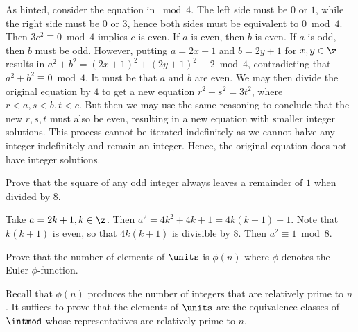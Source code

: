 \begin{problems}
    \begin{sol}
        As hinted, consider the equation in $\bmod 4$. The left side must be $0$ or $1$, while the right side must be $0$ or $3$, hence both sides must be equivalent to $0 \bmod 4$. Then $3c^2 \equiv 0 \bmod 4$ implies $c$ is even. If $a$ is even, then $b$ is even. If $a$ is odd, then $b$ must be odd. However, putting $a = 2x + 1$ and $b = 2y + 1$ for $x, y \in \z$ results in $a^2 + b^2 = (2x + 1)^2 + (2y + 1)^2 \equiv 2 \bmod 4$, contradicting that $a^2 + b^2 \equiv 0 \bmod 4$. It must be that $a$ and $b$ are even. We may then divide the original equation by $4$ to get a new equation $r^2 + s^2 = 3t^2$, where $r < a, s < b, t < c$. But then we may use the same reasoning to conclude that the new $r, s, t$ must also be even, resulting in a new equation with smaller integer solutions. This process cannot be iterated indefinitely as we cannot halve any integer indefinitely and remain an integer. Hence, the original equation does not have integer solutions.
    \end{sol}
    \item Prove that the square of any odd integer always leaves a remainder of $1$ when divided by $8$.
    \begin{sol}
        Take $a = 2k + 1, k \in \z$. Then $a^2 = 4k^2 + 4k + 1 = 4k(k + 1) + 1$. Note that $k(k + 1)$ is even, so that $4k(k + 1)$ is divisible by $8$. Then $a^2 \equiv 1 \bmod 8$.
    \end{sol}
    \item Prove that the number of elements of $\units$ is $\phi(n)$ where $\phi$ denotes the Euler $\phi$-function.
    \begin{sol}
        Recall that $\phi(n)$ produces the number of integers that are relatively prime to $n$. It suffices to prove that the elements of $\units$ are the equivalence classes of $\intmod$ whose representatives are relatively prime to $n$.
        

\end{sol}
\end{problems}
